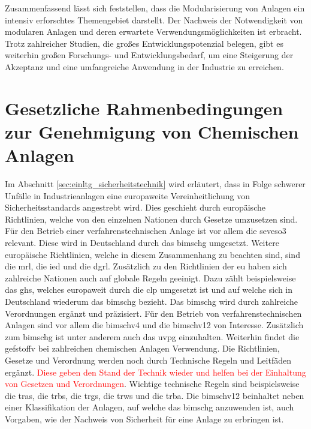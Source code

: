 Zusammenfassend l\"asst sich feststellen, dass die Modularisierung von Anlagen ein intensiv erforschtes Themengebiet darstellt. Der Nachweis der Notwendigkeit von modularen Anlagen und deren erwartete Verwendungsm\"oglichkeiten ist erbracht. Trotz zahlreicher Studien, die gro\ss{}es Entwicklungspotenzial belegen, gibt es weiterhin gro\ss{}en Forschungs- und Entwicklungsbedarf, um eine Steigerung der Akzeptanz und eine umfangreiche Anwendung in der Industrie zu erreichen.

\section{Gesetzliche Rahmenbedingungen zur Genehmigung von Chemischen Anlagen}
Im Abschnitt \ref{sec:einltg_sicherheitstechnik} wird erl\"autert, dass in Folge schwerer Unf\"alle in Industrieanlagen eine europaweite Vereinheitlichung von Sicherheitsstandards angestrebt wird. Dies geschieht durch europ\"aische Richtlinien, welche von den einzelnen Nationen durch Gesetze umzusetzen sind. F\"ur den Betrieb einer verfahrenstechnischen Anlage ist vor allem die \ac{seveso3} relevant. Diese wird in Deutschland durch das \acf{bimschg} umgesetzt. Weitere europ\"aische Richtlinien, welche in diesem Zusammenhang zu beachten sind, sind die \ac{mrl}, die \ac{ied} und die \ac{dgrl}. Zus\"atzlich zu den Richtlinien der \ac{eu} haben sich zahlreiche Nationen auch auf globale Regeln geeinigt. Dazu z\"ahlt beispielsweise das \ac{ghs}, welches europaweit durch die \ac{clp} umgesetzt ist und auf welche sich in Deutschland wiederum das \ac{bimschg} bezieht. \newline
Das \ac{bimschg} wird durch zahlreiche Verordnungen erg\"anzt und pr\"azisiert. F\"ur den Betrieb von verfahrenstechnischen Anlagen sind vor allem die \ac{bimschv4} und die \ac{bimschv12} von Interesse. \newline
Zus\"atzlich zum \ac{bimschg} ist unter anderem auch das \ac{uvpg} einzuhalten. Weiterhin findet die \ac{gefstoffv} bei zahlreichen chemischen Anlagen Verwendung. \newline
Die Richtlinien, Gesetze und Verordnung werden noch durch Technische Regeln und Leitf\"aden erg\"anzt. \textcolor{red}{Diese geben den Stand der Technik wieder und helfen bei der Einhaltung von Gesetzen und Verordnungen}. Wichtige technische Regeln sind beispielsweise die \ac{tras}, die \ac{trbs}, die \ac{trgs}, die \ac{trws} und die \ac{trba}. \newline
Die \ac{bimschv12} beinhaltet neben einer Klassifikation der Anlagen, auf welche das \ac{bimschg} anzuwenden ist, auch Vorgaben, wie der Nachweis von Sicherheit f\"ur eine Anlage zu erbringen ist. 

